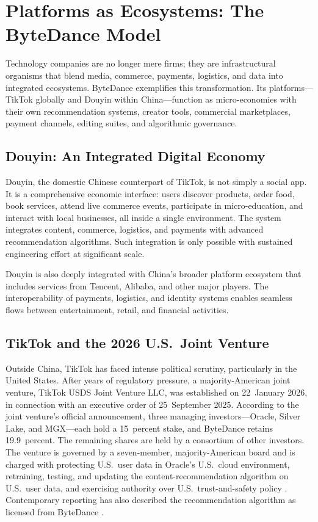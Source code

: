 \documentclass[12pt,letterpaper]{article}
\begin{document}
\FloatBarrier

\section{Platforms as Ecosystems: The ByteDance Model}
\label{sec:platforms}

Technology companies are no longer mere firms; they are infrastructural organisms that blend media, commerce, payments, logistics, and data into integrated ecosystems. ByteDance exemplifies this transformation. Its platforms---TikTok globally and Douyin within China---function as micro-economies with their own recommendation systems, creator tools, commercial marketplaces, payment channels, editing suites, and algorithmic governance.

\subsection{Douyin: An Integrated Digital Economy}

Douyin, the domestic Chinese counterpart of TikTok, is not simply a social app. It is a comprehensive economic interface: users discover products, order food, book services, attend live commerce events, participate in micro-education, and interact with local businesses, all inside a single environment. The system integrates content, commerce, logistics, and payments with advanced recommendation algorithms. Such integration is only possible with sustained engineering effort at significant scale.

Douyin is also deeply integrated with China's broader platform ecosystem that includes services from Tencent, Alibaba, and other major players. The interoperability of payments, logistics, and identity systems enables seamless flows between entertainment, retail, and financial activities.

\subsection{TikTok and the 2026 U.S.\ Joint Venture}

Outside China, TikTok has faced intense political scrutiny, particularly in the United States. After years of regulatory pressure, a majority-American joint venture, TikTok USDS Joint Venture LLC, was established on 22~January 2026, in connection with an executive order of 25~September 2025. According to the joint venture's official announcement, three managing investors---Oracle, Silver Lake, and MGX---each hold a 15~percent stake, and ByteDance retains 19.9~percent. The remaining shares are held by a consortium of other investors. The venture is governed by a seven-member, majority-American board and is charged with protecting U.S.\ user data in Oracle's U.S.\ cloud environment, retraining, testing, and updating the content-recommendation algorithm on U.S.\ user data, and exercising authority over U.S.\ trust-and-safety policy \cite{tiktokusds2026}. Contemporary reporting has also described the recommendation algorithm as licensed from ByteDance \cite{forristal2026}.
\end{document}
